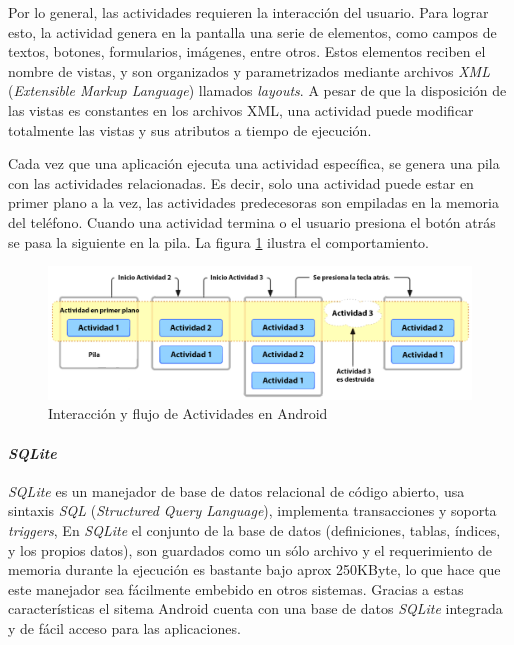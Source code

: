 Por lo general, las actividades requieren la interacción del usuario. Para lograr esto, la actividad genera en la pantalla una serie de elementos, como campos de textos, botones, formularios, imágenes, entre otros. Estos elementos reciben el nombre de vistas, y son organizados y parametrizados mediante archivos \textit{XML} (\textit{Extensible Markup Language}) llamados \textit{layouts}. A pesar de que la disposición de las vistas es constantes en los archivos XML, una actividad puede modificar totalmente las vistas y sus atributos a tiempo de ejecución.

Cada vez que una aplicación ejecuta una actividad específica, se genera una pila con las actividades relacionadas. Es decir, solo una actividad puede estar en primer plano a la vez, las actividades predecesoras son empiladas en la memoria del teléfono. Cuando una actividad termina o el usuario presiona el botón atrás se pasa la siguiente en la pila. La figura \ref{fig:backstack} ilustra el comportamiento.

\begin{figure}[h]
	\begin{center}
		\includegraphics[scale=0.7]{imagenes/diagram_backstack.png}
	\end{center}
	\caption{
		\label{fig:backstack}
		Interacción y flujo de Actividades en Android \cite{TBS}
	}
\end{figure}

\paragraph{\textit{SQLite}} \mbox{}

\textit{SQLite} es un manejador de base de datos relacional de código abierto, usa sintaxis \textit{SQL} (\textit{Structured Query Language}), implementa transacciones y soporta \textit{triggers}, En \textit{SQLite} el conjunto de la base de datos (definiciones, tablas, índices, y los propios datos), son guardados como un sólo archivo y el requerimiento de memoria durante la ejecución es bastante bajo aprox 250KByte, lo que hace que este manejador sea fácilmente embebido en otros sistemas. Gracias a estas características el sitema Android cuenta con una base de datos \textit{SQLite} integrada y de fácil acceso para las aplicaciones.

